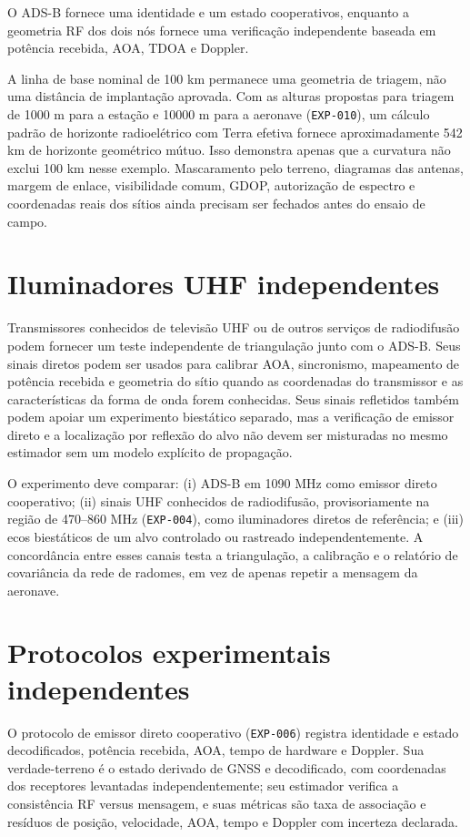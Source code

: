 O ADS-B fornece uma identidade e um estado cooperativos, enquanto a geometria RF dos dois nós fornece uma verificação independente baseada em potência recebida, AOA, TDOA e Doppler.

A linha de base nominal de 100 km permanece uma geometria de triagem, não uma distância de implantação aprovada. Com as alturas propostas para triagem de 1000 m para a estação e 10000 m para a aeronave (\texttt{EXP-010}), um cálculo padrão de horizonte radioelétrico com Terra efetiva fornece aproximadamente 542 km de horizonte geométrico mútuo. Isso demonstra apenas que a curvatura não exclui 100 km nesse exemplo. Mascaramento pelo terreno, diagramas das antenas, margem de enlace, visibilidade comum, GDOP, autorização de espectro e coordenadas reais dos sítios ainda precisam ser fechados antes do ensaio de campo.

\section{Iluminadores UHF independentes}
Transmissores conhecidos de televisão UHF ou de outros serviços de radiodifusão podem fornecer um teste independente de triangulação junto com o ADS-B. Seus sinais diretos podem ser usados para calibrar AOA, sincronismo, mapeamento de potência recebida e geometria do sítio quando as coordenadas do transmissor e as características da forma de onda forem conhecidas. Seus sinais refletidos também podem apoiar um experimento biestático separado, mas a verificação de emissor direto e a localização por reflexão do alvo não devem ser misturadas no mesmo estimador sem um modelo explícito de propagação.

O experimento deve comparar: (i) ADS-B em 1090 MHz como emissor direto cooperativo; (ii) sinais UHF conhecidos de radiodifusão, provisoriamente na região de 470--860 MHz (\texttt{EXP-004}), como iluminadores diretos de referência; e (iii) ecos biestáticos de um alvo controlado ou rastreado independentemente. A concordância entre esses canais testa a triangulação, a calibração e o relatório de covariância da rede de radomes, em vez de apenas repetir a mensagem da aeronave.

\section{Protocolos experimentais independentes}
O protocolo de emissor direto cooperativo (\texttt{EXP-006}) registra identidade e estado decodificados, potência recebida, AOA, tempo de hardware e Doppler. Sua verdade-terreno é o estado derivado de GNSS e decodificado, com coordenadas dos receptores levantadas independentemente; seu estimador verifica a consistência RF versus mensagem, e suas métricas são taxa de associação e resíduos de posição, velocidade, AOA, tempo e Doppler com incerteza declarada.

